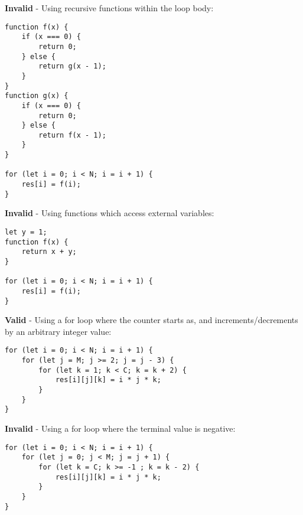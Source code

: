 \textbf{Invalid} - Using recursive functions within the loop body:
\begin{verbatim}
function f(x) {
    if (x === 0) {
        return 0;
    } else {
        return g(x - 1);
    }
}
function g(x) {
    if (x === 0) {
        return 0;
    } else {
        return f(x - 1);
    }
}

for (let i = 0; i < N; i = i + 1) {
    res[i] = f(i);
}
\end{verbatim}

\textbf{Invalid} - Using functions which access external variables:
\begin{verbatim}
let y = 1;
function f(x) {
    return x + y;
}

for (let i = 0; i < N; i = i + 1) {
    res[i] = f(i);
}
\end{verbatim}

\textbf{Valid} - Using a for loop where the counter starts as, and increments/decrements by an arbitrary integer value:
\begin{verbatim}
for (let i = 0; i < N; i = i + 1) {
    for (let j = M; j >= 2; j = j - 3) {
        for (let k = 1; k < C; k = k + 2) {
            res[i][j][k] = i * j * k;
        }
    }
}
\end{verbatim}

\textbf{Invalid} - Using a for loop where the terminal value is negative:
\begin{verbatim}
for (let i = 0; i < N; i = i + 1) {
    for (let j = 0; j < M; j = j + 1) {
        for (let k = C; k >= -1 ; k = k - 2) {
            res[i][j][k] = i * j * k;
        }
    }
}
\end{verbatim}

\newpage



\newpage





